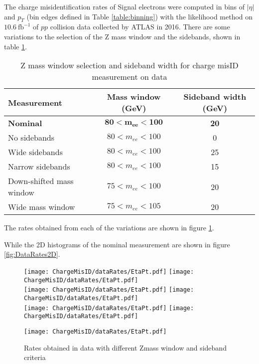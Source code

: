 The charge misidentification rates of Signal electrons were computed in bins of $|\eta|$ and $p_T$ (bin edges defined in Table \ref{table:binning}) with the likelihood method on $10.6\  \text{fb}^{-1}$ of $pp$ collision data collected by ATLAS in 2016. There are some variations to the selection of the Z mass window and the sidebands, shown in table \ref{table:DataSelection}.

\begin{table}
\centering
\begin{tabular}{p{5cm} c c}
\textbf{Measurement} & \textbf{Mass window (GeV)} & \textbf{Sideband width (GeV)}\\
\hline
\textbf{Nominal}         & {$\mathbf{80 < m_{ee} < 100}$} & \textbf{20} \\
No sidebands             & $80 < m_{ee} < 100$            & 0           \\
Wide sidebands           & $80 < m_{ee} < 100$            & 25          \\
Narrow sidebands         & $80 < m_{ee} < 100$            & 15          \\
Down-shifted mass window & $75 < m_{ee} < 100$            & 20          \\
Wide mass window         & $75 < m_{ee} < 105$            & 20          \\
\end{tabular}
\caption{Z mass window selection and sideband width for charge misID measurement on data}
\label{table:DataSelection}
\end{table}

The rates obtained from each of the variations are shown in figure \ref{fig:DataRates}.

While the 2D histograms of the nominal measurement are shown in figure \ref{fig:DataRates2D}.

\begin{figure}[h]
\centering
\texttt{[image: ChargeMisID/dataRates/EtaPt.pdf]}
\texttt{[image: ChargeMisID/dataRates/EtaPt.pdf]}\\
\texttt{[image: ChargeMisID/dataRates/EtaPt.pdf]}
\texttt{[image: ChargeMisID/dataRates/EtaPt.pdf]}\\
\texttt{[image: ChargeMisID/dataRates/EtaPt.pdf]}
\texttt{[image: ChargeMisID/dataRates/EtaPt.pdf]}
\end{figure}

\begin{figure}[h]
\ContinuedFloat
\centering
\texttt{[image: ChargeMisID/dataRates/EtaPt.pdf]}
\caption{Rates obtained in data with different Zmass window and sideband criteria}
\label{fig:DataRates}
\end{figure}

